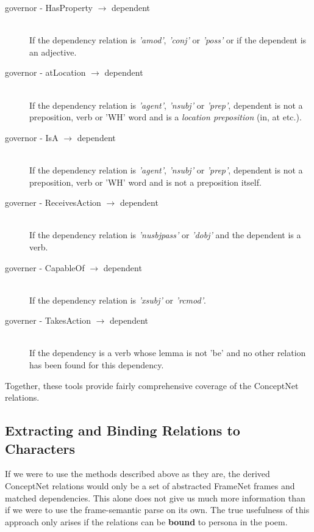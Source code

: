 \begin{description}
\item[governor - HasProperty $\rightarrow$ dependent]  \hfill \\
If the dependency relation is \textit{'amod'}, \textit{'conj'} or \textit{'poss'} or if the dependent is an adjective.

\item[governor - atLocation $\rightarrow$ dependent] \hfill \\
If the dependency relation is \textit{'agent'}, \textit{'nsubj'} or \textit{'prep'}, dependent is not a preposition, verb or 'WH' word and is a \textit{location preposition} (in, at etc.).
	
\item[governor - IsA $\rightarrow$ dependent] \hfill \\
If the dependency relation is \textit{'agent'}, \textit{'nsubj'} or \textit{'prep'}, dependent is not a preposition, verb or 'WH' word and is not a preposition itself.
	
\item[governer - ReceivesAction $\rightarrow$ dependent] \hfill \\
If the dependency relation is \textit{'nusbjpass'} or \textit{'dobj'} and the dependent is a verb.

\item[governer - CapableOf $\rightarrow$ dependent] \hfill \\
If the dependency relation is \textit{'xsubj'} or \textit{'rcmod'}.

\item[governer - TakesAction $\rightarrow$ dependent] \hfill \\
If the dependency is a verb whose lemma is not 'be' and no other relation has been found for this dependency.
\end{description}

Together, these tools provide fairly comprehensive coverage of the ConceptNet relations.


\subsection{Extracting and Binding Relations to Characters}

If we were to use the methods described above as they are, the derived ConceptNet relations would only be a set of abstracted FrameNet frames and matched dependencies. This alone does not give us much more information than if we were to use the frame-semantic parse on its own. The true usefulness of this approach only arises if the relations can be \textbf{bound} to persona in the poem. 

